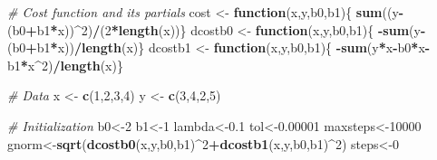 \documentclass[
]{book}
\newenvironment{Shaded}{\begin{snugshade}}{\end{snugshade}}
\newcommand{\CommentTok}[1]{\textcolor[rgb]{0.56,0.35,0.01}{\textit{#1}}}
\newcommand{\ControlFlowTok}[1]{\textcolor[rgb]{0.13,0.29,0.53}{\textbf{#1}}}
\newcommand{\DecValTok}[1]{\textcolor[rgb]{0.00,0.00,0.81}{#1}}
\newcommand{\FloatTok}[1]{\textcolor[rgb]{0.00,0.00,0.81}{#1}}
\newcommand{\FunctionTok}[1]{\textcolor[rgb]{0.13,0.29,0.53}{\textbf{#1}}}
\newcommand{\NormalTok}[1]{#1}
\newcommand{\OtherTok}[1]{\textcolor[rgb]{0.56,0.35,0.01}{#1}}
\newcommand{\SpecialCharTok}[1]{\textcolor[rgb]{0.81,0.36,0.00}{\textbf{#1}}}
\theoremstyle{definition}
\theoremstyle{definition}
\theoremstyle{definition}
\theoremstyle{definition}
\theoremstyle{remark}
\begin{document}
\begin{Shaded}
\begin{Highlighting}[]
\CommentTok{\# Cost function and its partials}
\NormalTok{cost }\OtherTok{\textless{}{-}} \ControlFlowTok{function}\NormalTok{(x,y,b0,b1)\{}
  \FunctionTok{sum}\NormalTok{((y}\SpecialCharTok{{-}}\NormalTok{(b0}\SpecialCharTok{+}\NormalTok{b1}\SpecialCharTok{*}\NormalTok{x))}\SpecialCharTok{\^{}}\DecValTok{2}\NormalTok{)}\SpecialCharTok{/}\NormalTok{(}\DecValTok{2}\SpecialCharTok{*}\FunctionTok{length}\NormalTok{(x))\}}
\NormalTok{dcostb0 }\OtherTok{\textless{}{-}} \ControlFlowTok{function}\NormalTok{(x,y,b0,b1)\{}
  \SpecialCharTok{{-}}\FunctionTok{sum}\NormalTok{(y}\SpecialCharTok{{-}}\NormalTok{(b0}\SpecialCharTok{+}\NormalTok{b1}\SpecialCharTok{*}\NormalTok{x))}\SpecialCharTok{/}\FunctionTok{length}\NormalTok{(x)\}}
\NormalTok{dcostb1 }\OtherTok{\textless{}{-}} \ControlFlowTok{function}\NormalTok{(x,y,b0,b1)\{}
  \SpecialCharTok{{-}}\FunctionTok{sum}\NormalTok{(y}\SpecialCharTok{*}\NormalTok{x}\SpecialCharTok{{-}}\NormalTok{b0}\SpecialCharTok{*}\NormalTok{x}\SpecialCharTok{{-}}\NormalTok{b1}\SpecialCharTok{*}\NormalTok{x}\SpecialCharTok{\^{}}\DecValTok{2}\NormalTok{)}\SpecialCharTok{/}\FunctionTok{length}\NormalTok{(x)\}}

\CommentTok{\# Data}
\NormalTok{x }\OtherTok{\textless{}{-}} \FunctionTok{c}\NormalTok{(}\DecValTok{1}\NormalTok{,}\DecValTok{2}\NormalTok{,}\DecValTok{3}\NormalTok{,}\DecValTok{4}\NormalTok{)}
\NormalTok{y }\OtherTok{\textless{}{-}} \FunctionTok{c}\NormalTok{(}\DecValTok{3}\NormalTok{,}\DecValTok{4}\NormalTok{,}\DecValTok{2}\NormalTok{,}\DecValTok{5}\NormalTok{)}

\CommentTok{\# Initialization}
\NormalTok{b0}\OtherTok{\textless{}{-}}\DecValTok{2}
\NormalTok{b1}\OtherTok{\textless{}{-}}\DecValTok{1}
\NormalTok{lambda}\OtherTok{\textless{}{-}}\FloatTok{0.1}
\NormalTok{tol}\OtherTok{\textless{}{-}}\FloatTok{0.00001}
\NormalTok{maxsteps}\OtherTok{\textless{}{-}}\DecValTok{10000}
\NormalTok{gnorm}\OtherTok{\textless{}{-}}\FunctionTok{sqrt}\NormalTok{(}\FunctionTok{dcostb0}\NormalTok{(x,y,b0,b1)}\SpecialCharTok{\^{}}\DecValTok{2}\SpecialCharTok{+}\FunctionTok{dcostb1}\NormalTok{(x,y,b0,b1)}\SpecialCharTok{\^{}}\DecValTok{2}\NormalTok{)}
\NormalTok{steps}\OtherTok{\textless{}{-}}\DecValTok{0}
\end{Highlighting}
\end{Shaded}
\end{document}
